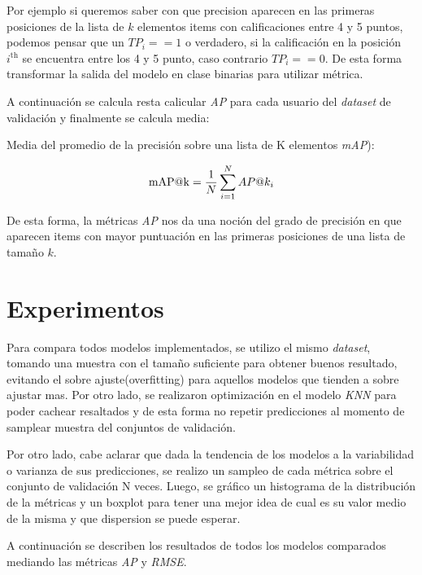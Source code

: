 \documentclass[11pt,a4paper,twoside]{thesis}
\begin{document}
Por ejemplo si queremos saber con que precision aparecen en las primeras posiciones de la lista de $k$ elementos items con calificaciones entre 4 y 5 puntos, podemos pensar que un $TP_i == 1$ o verdadero, si la calificación en la posición $i^\mathrm{th}$ se encuentra entre los 4 y 5 punto, caso contrario $TP_i == 0$. De esta forma transformar la salida del modelo en clase binarias para utilizar métrica.

A continuación se calcula resta calicular \textit{AP\makeatletter@k} para cada usuario  del \textit{dataset} de validación y finalmente se calcula media: 


\begin{description}
	\item[Media del promedio de la precisión sobre una lista de K elementos \textit{mAP\makeatletter@k}):]
\end{description}
\begin{equation*}
	\operatorname{mAP\makeatletter@k}=\frac{1}{N} \sum_{i=1}^N AP\makeatletter@k_i
\end{equation*}

De esta forma, la métricas \textit{AP\makeatletter@k} nos da una noción del grado de precisión en que aparecen items con mayor puntuación en las primeras posiciones de una lista de tamaño $k$.


\chapter{Experimentos}

Para compara todos modelos implementados, se utilizo el mismo \textit{dataset}, tomando una muestra con el tamaño suficiente para obtener buenos resultado, evitando el sobre ajuste(overfitting) para aquellos modelos que tienden a sobre ajustar mas. Por otro lado, se realizaron optimización en el modelo \textit{KNN} para poder cachear resaltados y de esta forma no repetir predicciones al momento de samplear muestra del conjuntos de validación.

Por otro lado, cabe aclarar que dada la tendencia de los modelos a la variabilidad o varianza de sus predicciones, se realizo un sampleo de cada métrica sobre el conjunto de validación N veces. Luego, se gráfico un histograma de la distribución de la métricas y un boxplot para tener una mejor idea de cual es su valor medio de la misma y que dispersion se puede esperar.


A continuación se describen los resultados de todos los modelos comparados mediando las métricas \textit{AP\makeatletter@k} y \textit{RMSE}.
\end{document}
